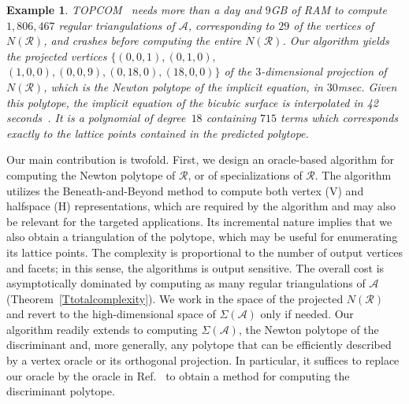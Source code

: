 \documentclass{article}
\newtheorem{example}{Example}
\newcommand\refcite[1]{\citealp{#1}} \newcommand\citess[1]{\textsuperscript{\textup{\citealp{#1}}}}
\def\A{{\mathcal A}} \def\R{{\mathcal R}}
\begin{document}
\begin{example}
TOPCOM~\citess{RambTOPCOM} 
needs more than a day and $9$GB of RAM to compute $1,806,467$
regular triangulations of $\A$, corresponding to $29$ of the vertices of
$N(\R)$, and crashes before computing the entire $N(\R)$.
Our algorithm yields the projected vertices
$\{(0,0,1),(0,1,0),$ $(1,0,0),(0,0,9),(0,18,0),(18,0,0)\}$
of the $3$-di\-men\-sional projection of $N(\R)$,
which is the Newton polytope of the implicit equation, in $30$msec.
Given this polytope, the implicit equation of the 
bicubic surface is interpolated in 42 seconds~\citess{EKKL12spm}. 
It is a polynomial of degree~$18$ containing $715$ terms which corresponds
exactly to the lattice points contained in the predicted polytope.
\end{example} 
 
Our main contribution is twofold.
First, we design an oracle-based algorithm for computing the
Newton polytope of $\mathcal{R}$, or of specializations of $\R$.  
The algorithm utilizes the Beneath-and-Beyond method to compute 
both vertex (V) and halfspace (H)
representations, which are required by the algorithm and may
also be relevant for the targeted applications.
Its incremental nature implies that we also obtain a triangulation of the
polytope, which may be useful for enumerating its lattice points.
The complexity is proportional to the number of output vertices and facets;
in this sense, the algorithms is output sensitive.
The overall cost is asymptotically dominated by computing as many
regular triangulations of $\A$ (Theorem~\ref{Ttotalcomplexity}).
We work in the space of the projected $N(\R)$ and revert to
the high-dimensional space of $\Sigma(\A)$ only if needed. 
Our algorithm readily extends to computing $\Sigma(\A)$, the Newton
polytope of the discriminant
and, more generally, any polytope that can
be efficiently described by a vertex oracle or its orthogonal projection.
In particular, it suffices to replace our oracle by the oracle in
Ref.~\refcite{Rincon12} to obtain a method for computing the discriminant
polytope.
\end{document}
